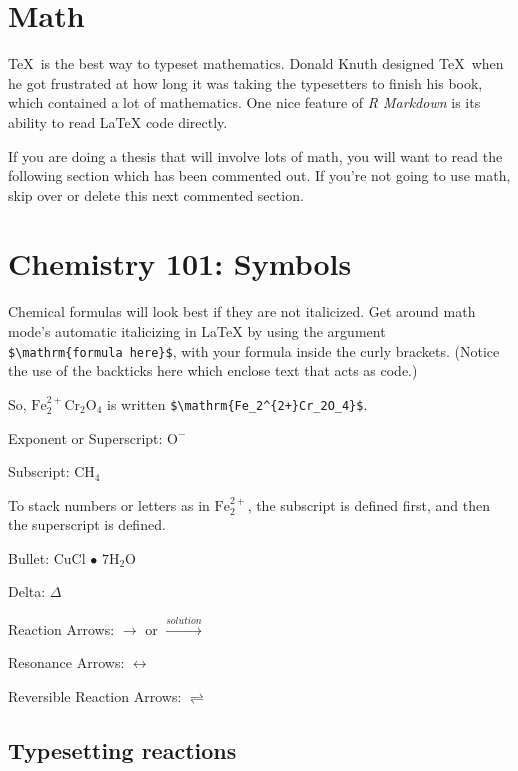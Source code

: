 \documentclass[12pt,twoside]{reedthesis}
\begin{document}
\hypertarget{math}{%
\section{Math}\label{math}}

\TeX~is the best way to typeset mathematics. Donald Knuth designed \TeX~when he got frustrated at how long it was taking the typesetters to finish his book, which contained a lot of mathematics. One nice feature of \emph{R Markdown} is its ability to read LaTeX code directly.

If you are doing a thesis that will involve lots of math, you will want to read the following section which has been commented out. If you're not going to use math, skip over or delete this next commented section.

\hypertarget{chemistry-101-symbols}{%
\section{Chemistry 101: Symbols}\label{chemistry-101-symbols}}

Chemical formulas will look best if they are not italicized. Get around math mode's automatic italicizing in LaTeX by using the argument \texttt{\$\textbackslash{}mathrm\{formula\ here\}\$}, with your formula inside the curly brackets. (Notice the use of the backticks here which enclose text that acts as code.)

So, \(\mathrm{Fe_2^{2+}Cr_2O_4}\) is written \texttt{\$\textbackslash{}mathrm\{Fe\_2\^{}\{2+\}Cr\_2O\_4\}\$}.

\noindent Exponent or Superscript: \(\mathrm{O^-}\)

\noindent Subscript: \(\mathrm{CH_4}\)

To stack numbers or letters as in \(\mathrm{Fe_2^{2+}}\), the subscript is defined first, and then the superscript is defined.

\noindent Bullet: CuCl \(\bullet\) \(\mathrm{7H_{2}O}\)

\noindent Delta: \(\Delta\)

\noindent Reaction Arrows: \(\longrightarrow\) or \(\xrightarrow{solution}\)

\noindent Resonance Arrows: \(\leftrightarrow\)

\noindent Reversible Reaction Arrows: \(\rightleftharpoons\)

\hypertarget{typesetting-reactions}{%
\subsection{Typesetting reactions}\label{typesetting-reactions}}
\end{document}

